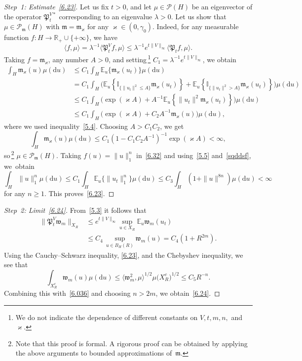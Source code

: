\documentclass[AHL,Unicode,longabstracts]{cedram}
\newcommand{\R}{{\mathbb R}}
\newcommand{\I}{{\mathbb I}}
\newcommand{\E}{{\mathbb E}}
\newcommand{\PP}{{\mathcal P}}
\newcommand{\vk}{{\varkappa}}
\newcommand{\la}{\lambda}
\newcommand{\ty}{\infty}
\newcommand{\wwww}{{\mathfrak w}}
\newcommand{\mm}{{\mathfrak m}}
\newcommand{\PPPP}{{\mathfrak P}}
\newcommand{\lag}{\langle}
\newcommand{\rag}{\rangle}
\newcommand{\dd}{\mathrm{d}}
\newenvironment{step}{\begin{proof}}{\let\qed\relax \end{proof}}
\begin{document}
\begin{proofc}

\begin{step}[Step~1: Estimate~\eqref{6.23}]
Let us fix $t>0$, and let $\mu \in \PP(H)$ be an eigenvector of the operator $\PPPP_t^{V*}$ corresponding to an eigenvalue $\la>0$. Let us show that $\mu \in \PP_{\mm}(H)$ with $\mm=\mm_\vk$ for any $\vk\in (0,\gamma_0)$. Indeed, for any measurable function $f:H\to\R_+\cup\{+\ty\}$, we have
\begin{equation}
\lag f, \mu\rag=\lambda^{-1}\lag \PPPP_t^Vf, \mu\rag \le \lambda^{-1}e^{t\|V\|_\infty}\lag \PPPP_tf, \mu\rag.\label{6.32}
\end{equation}
Taking $f=\mm_\vk$, any number $A>0$, and setting\,\footnote{We do not indicate the dependence of different constants on $V,t,m,n,$ and $\vk$.} $C_1= \lambda^{-1}e^{t\|V\|_\infty}$, we obtain
\begin{align*}
\int_{H} \mm_\vk(u) \mu(\dd u)&\le C_1 \int_{H} \E_u \{\mm_{\vk}(u_t)\}\mu(\dd u) \\&=C_1 \!\!\int_{H}\!\!\Big(\E_u \left\{ \I_{\{\|u_t\|^2\le A\}} \mm_\varkappa(u_t) \right\}
\!+\! \E_u \left\{ \I_{\{\|u_t\|^2> A\}} \mm_\varkappa(u_t) \right\}\!\Big)\mu(\dd u)\\&\le C_1 \int_{H}\big(\exp(\vk A)+A^{-1} \E_u \left\{ \|u_t\|^2 \mm_\varkappa(u_t) \right\}\big)\mu(\dd u)\\&\le C_1 \int_{H}\big(\exp(\vk A)+C_2A^{-1} \mm_\vk(u)\big)\mu(\dd u),
\end{align*}
where we used inequality~\eqref{5.4}. Choosing $A>C_1C_2$, we get
\begin{equation}\label{sqddsf}
\int_{H} \mm_\vk(u) \mu(\dd u)\le C_1(1- C_1C_2 A^{-1})^{-1}\exp(\vk A)<\ty,
\end{equation}
so\,\footnote{Note that this proof is formal. A rigorous proof can be obtained by applying the above arguments to bounded approximations of~$\mm$.} $\mu\in \PP_\mm(H)$. Taking $f(u)=\|u\|_1^n $ in~\eqref{6.32} and using~\eqref{5.5} and~\eqref{sqddsf}, we~obtain
\[
\int_{H} \|u\|_1^n \mu(\dd u) \le C_1 \int_{H} \E_u \{\|u_t\|_1^n\}\mu(\dd u) \le C_3 \int_{H} (1+\|u\|^{8n})\mu(\dd u)<\ty
\]
for any $n\ge1$. This proves~\eqref{6.23}.
\end{step}

\begin{step}[Step~2: Limit~\eqref{6.24}]
From~\eqref{5.3} it follows that
\begin{align}\label{6.036}
\|\PPPP_t^V\wwww_m\|_{X_R}&\le e^{t\|V\|_\infty}\sup_{u\in X_R}\E_u\wwww_m(u_t)\nonumber\\&
\le C_4 \,\sup_{u\in B_H(R)}\wwww_m(u)= C_4(1+ R^{2m}).
\end{align}
Using the Cauchy--Schwarz inequality, \eqref{6.23}, and the Chebyshev inequality, we see that
\[
\int_{X_R^c}\wwww_m(u)\mu(\dd u)
\le \langle\wwww_m^2,\mu\rangle^{1/2} \mu\bigl(X_R^c\bigr)^{1/2}\le C_{5}R^{-n}.
\]
Combining this with~\eqref{6.036} and choosing $n>2m$, we obtain~\eqref{6.24}.
\end{step}


\end{proofc}
\end{document}
